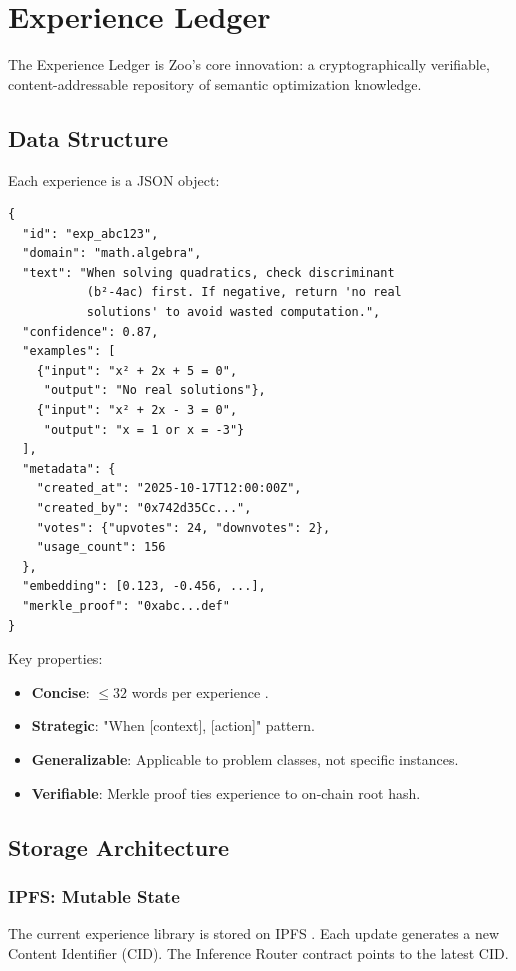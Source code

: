 \section{Experience Ledger}


The Experience Ledger is Zoo's core innovation: a cryptographically verifiable, content-addressable repository of semantic optimization knowledge.

\subsection{Data Structure}

Each experience is a JSON object:
\begin{verbatim}
{
  "id": "exp_abc123",
  "domain": "math.algebra",
  "text": "When solving quadratics, check discriminant
           (b²-4ac) first. If negative, return 'no real
           solutions' to avoid wasted computation.",
  "confidence": 0.87,
  "examples": [
    {"input": "x² + 2x + 5 = 0",
     "output": "No real solutions"},
    {"input": "x² + 2x - 3 = 0",
     "output": "x = 1 or x = -3"}
  ],
  "metadata": {
    "created_at": "2025-10-17T12:00:00Z",
    "created_by": "0x742d35Cc...",
    "votes": {"upvotes": 24, "downvotes": 2},
    "usage_count": 156
  },
  "embedding": [0.123, -0.456, ...],
  "merkle_proof": "0xabc...def"
}
\end{verbatim}

Key properties:
\begin{itemize}
\item \textbf{Concise}: $\leq 32$ words per experience \cite{tencent2025grpo}.
\item \textbf{Strategic}: "When [context], [action]" pattern.
\item \textbf{Generalizable}: Applicable to problem classes, not specific instances.
\item \textbf{Verifiable}: Merkle proof ties experience to on-chain root hash.
\end{itemize}

\subsection{Storage Architecture}

\subsubsection{IPFS: Mutable State}

The current experience library is stored on IPFS \cite{benet2014ipfs}. Each update generates a new Content Identifier (CID). The Inference Router contract points to the latest CID.

